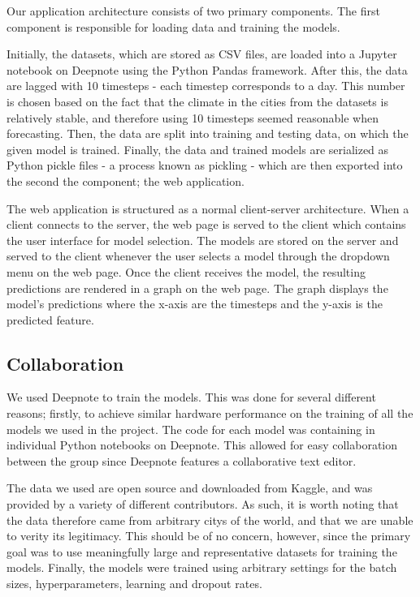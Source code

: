 Our application architecture consists of two primary components.
The first component is responsible for loading data and training the models.

Initially, the datasets, which are stored as CSV files, are loaded into a Jupyter notebook on Deepnote using the Python Pandas framework.
After this, the data are lagged with 10 timesteps - each timestep corresponds to a day.
This number is chosen based on the fact that the climate in the cities from the datasets is relatively stable, and therefore using 10 timesteps seemed reasonable when forecasting.
Then, the data are split into training and testing data, on which the given model is trained. 
Finally, the data and trained models are serialized as Python pickle files - a process known as pickling - which are then exported into the second the component; the web application.

The web application is structured as a normal client-server architecture.
When a client connects to the server, the web page is served to the client which contains the user interface for model selection.
The models are stored on the server and served to the client whenever the user selects a model through the dropdown menu on the web page.
Once the client receives the model, the resulting predictions are rendered in a graph on the web page.
The graph displays the model's predictions where the x-axis are the timesteps and the y-axis is the predicted feature.


\subsection{Collaboration}
We used Deepnote\cite{deepnote} to train the models. 
This was done for several different reasons; firstly, to achieve similar hardware performance on the training of all the models we used in the project.
The code for each model was containing in individual Python notebooks on Deepnote.
This allowed for easy collaboration between the group since Deepnote features a collaborative text editor.

The data we used are open source and downloaded from Kaggle\cite{kaggle}, and was provided by a variety of different contributors.
As such, it is worth noting that the data therefore came from arbitrary citys of the world, and that we are unable to verity its legitimacy.
This should be of no concern, however, since the primary goal was to use meaningfully large and representative datasets for training the models.
Finally, the models were trained using arbitrary settings for the batch sizes, hyperparameters, learning and dropout rates.


